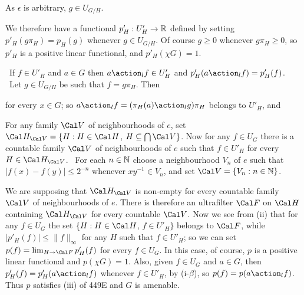 {

\noindent As $\epsilon$ is arbitrary, $g\in U_{G/H}$.\ \Qed

We therefore have a functional $p'_H:U'_H\to\Bbb R$ defined by setting
$p'_H(g\pi_H)=p_H(g)$ whenever $g\in U_{G/H}$.   Of course $g\ge 0$
whenever $g\pi_H\ge 0$, so $p'_H$ is a positive linear functional, and
$p'_H(\chi G)=1$.

\medskip

\qquad\grheadb\
If $f\in U'_H$ and $a\in G$ then $a\action_lf\in U'_H$ and
$p'_H(a\action_lf)=p'_H(f)$.   \Prf\ Let $g\in U_{G/H}$ be such that
$f=g\pi_H$.   Then


\noindent for every $x\in G$;  so $a\action_lf=(\pi_H(a)\action_lg)\pi_H$
belongs to $U'_H$, and


\medskip

 For any family $\Cal V$ of neighbourhoods of $e$,
set $\Cal H_{\Cal V}=\{H:H\in\Cal H$, $H\subseteq\bigcap\Cal V\}$.
Now for any $f\in U_G$ there is a countable family $\Cal V$ of
neighbourhoods of $e$ such that $f\in U'_H$ for every
$H\in\Cal H_{\Cal V}$.
\Prf\ For each $n\in\Bbb N$ choose a
neighbourhood $V_n$ of $e$ such that $|f(x)-f(y)|\le 2^{-n}$ whenever
$xy^{-1}\in V_n$, and set $\Cal V=\{V_n:n\in\Bbb N\}$.\ \Qed

\medskip

 We are supposing that $\Cal H_{\Cal V}$ is non-empty for
every countable family $\Cal V$ of neighbourhoods of $e$.   There is
therefore an ultrafilter $\Cal F$ on $\Cal H$ containing $\Cal H_{\Cal V}$
for every countable $\Cal V$.   Now we see
from (ii) that for any $f\in U_G$ the set
$\{H:H\in\Cal H$, $f\in U'_H\}$ belongs to $\Cal F$, while
$|p'_H(f)|\le\|f\|_{\infty}$ for any $H$ such that $f\in U'_H$;  so we can
set $p(f)=\lim_{H\to\Cal F}p'_H(f)$ for every $f\in U_G$.    In this case,
of course, $p$ is a positive linear functional and $p(\chi G)=1$.
Also, given $f\in U_G$ and $a\in G$, then
$p'_H(f)=p'_H(a\action_lf)$ whenever $f\in U'_H$, by (i-$\beta$), so
$p(f)=p(a\action_lf)$.   Thus $p$ satisfies (iii) of 449E and $G$ is
amenable.
}%

